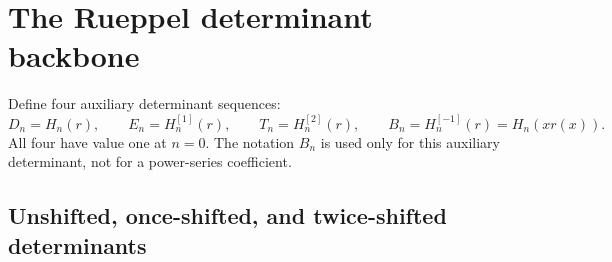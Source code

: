 \documentclass[11pt,a4paper]{article}
\numberwithin{equation}{section}
\theoremstyle{definition}
\theoremstyle{remark}
\begin{document}
\section{The Rueppel determinant backbone}\label{sec:backbone}

Define four auxiliary determinant sequences:
\begin{equation}\label{eq:DETB}
 D_n=H_n(r),\qquad E_n=H_n^{[1]}(r),\qquad
 T_n=H_n^{[2]}(r),\qquad B_n=H_n^{[-1]}(r)=H_n(xr(x)).
\end{equation}
All four have value one at $n=0$. The notation $B_n$ is used only for this
auxiliary determinant, not for a power-series coefficient.

\subsection{Unshifted, once-shifted, and twice-shifted determinants}
\end{document}
